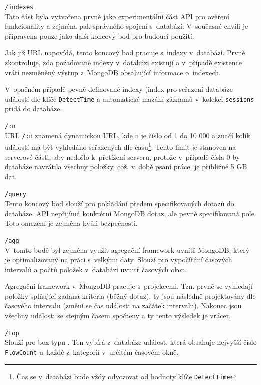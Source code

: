 \begin{description}
    \item \texttt{/indexes} \\
        Tato část byla vytvořena prvně jako experimentální část API pro ověření funkcionality a zejména pak správného spojení s~databází. V~současné chvíli je připravena pouze jako další koncový bod pro budoucí použití.

        Jak již URL napovídá, tento koncový bod pracuje s~indexy v~databázi. Prvně zkontroluje, zda požadované indexy v~databázi existují a v~případě existence vrátí nezměněný výstup z~MongoDB obsahující informace o~indexech.

        V~opačném případě pevně definované indexy (index pro seřazení databáze událostí dle klíče \texttt{DetectTime} a automatické mazání záznamů v~kolekci \texttt{sessions} přidá do databáze.
        
    \item \texttt{/:n}\\
        URL \texttt{/:n} znamená dynamickou URL, kde \texttt{n} je číslo od 1 do 10 000 a značí kolik událostí má být vyhledáno seřazených dle času\footnote{Čas se v~databázi bude vždy odvozovat od hodnoty klíče \texttt{DetectTime}}. Tento limit je stanoven na serverové části, aby nedošlo k~přetížení serveru, protože v~případě čísla 0 by databáze navrátila všechny položky, což, v~době psaní práce, je přibližně 5 GB dat.

    \item \texttt{/query}\\
        Tento koncový bod slouží pro pokládání předem specifikovaných dotazů do databáze. API nepřijímá konkrétní MongoDB dotaz, ale pevně specifikovaná pole. Toto omezení je zejména kvůli bezpečnosti. 

    \item \texttt{/agg}\\
        V~tomto bodě byl zejména využit agregační framework uvnitř MongoDB, který je optimalizovaný na práci s~velkými daty. Slouží pro vypočítání časových intervalů a počtů položek v~databázi uvnitř časových oken.

        Agregační framework v~MongoDB pracuje s~projekcemi. Tzn. prvně se vyhledají položky splňující zadaná kritéria (běžný dotaz), ty jsou následně projektovány dle časového intervalu (změní se čas události na začátek intervalu). Nakonec jsou všechny události se stejným časem spočteny a ty tento výsledek je vrácen.

    \item \texttt{/top}\\
        Slouží pro box typu . Ten vybírá z~databáze událost, která obsahuje nejvyšší číslo \texttt{FlowCount} u~každé z~kategorií v~určitém časovém okně.


\end{description}
